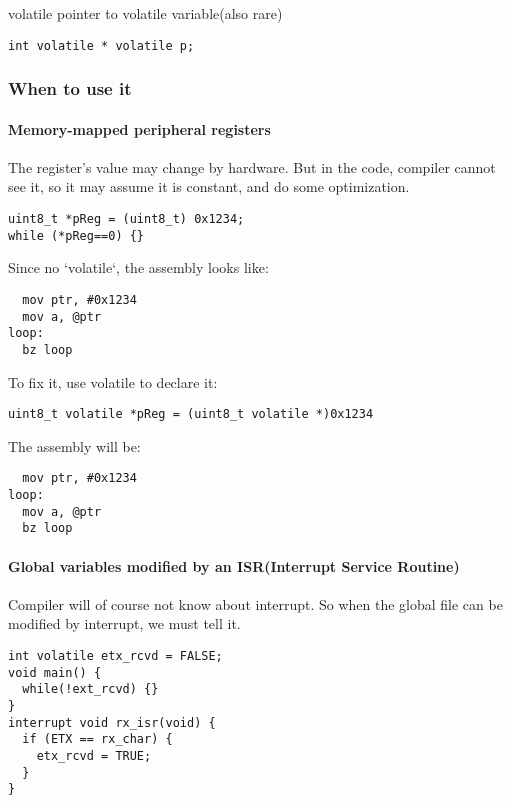 volatile pointer to volatile variable(also rare)

\begin{lstlisting}
int volatile * volatile p;
\end{lstlisting}

\subsubsection{When to use it}

\paragraph{Memory-mapped peripheral registers}
The register's value may change by hardware.  But in the code,
compiler cannot see it, so it may assume it is constant, and do some
optimization.

\begin{lstlisting}
uint8_t *pReg = (uint8_t) 0x1234;
while (*pReg==0) {}
\end{lstlisting}

Since no `volatile`, the assembly looks like:

\begin{lstlisting}
  mov ptr, #0x1234
  mov a, @ptr
loop:
  bz loop
\end{lstlisting}

To fix it, use volatile to declare it:

\begin{lstlisting}
uint8_t volatile *pReg = (uint8_t volatile *)0x1234
\end{lstlisting}

The assembly will be:

\begin{lstlisting}
  mov ptr, #0x1234
loop:
  mov a, @ptr
  bz loop
\end{lstlisting}
\paragraph{Global variables modified by an ISR(Interrupt Service Routine)}
Compiler will of course not know about interrupt.
So when the global file can be modified by interrupt,
we must tell it.

\begin{lstlisting}
int volatile etx_rcvd = FALSE;
void main() {
  while(!ext_rcvd) {}
}
interrupt void rx_isr(void) {
  if (ETX == rx_char) {
    etx_rcvd = TRUE;
  }
}
\end{lstlisting}

